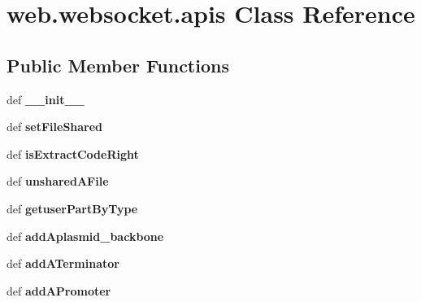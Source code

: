 \hypertarget{classweb_1_1websocket_1_1apis}{\section{web.\-websocket.\-apis Class Reference}
\label{classweb_1_1websocket_1_1apis}
}
\subsection*{Public Member Functions}
\begin{DoxyCompactItemize}
\item 
\hypertarget{classweb_1_1websocket_1_1apis_a5238c2beaa2b1d0a072d166fd98fc59c}{def {\bfseries \-\_\-\-\_\-init\-\_\-\-\_\-}}\label{classweb_1_1websocket_1_1apis_a5238c2beaa2b1d0a072d166fd98fc59c}

\item 
\hypertarget{classweb_1_1websocket_1_1apis_a3fec76d778807e6ac958f69df5bcbe43}{def {\bfseries set\-File\-Shared}}\label{classweb_1_1websocket_1_1apis_a3fec76d778807e6ac958f69df5bcbe43}

\item 
\hypertarget{classweb_1_1websocket_1_1apis_afad457c5d1683e83f299b5a8e8bc6895}{def {\bfseries is\-Extract\-Code\-Right}}\label{classweb_1_1websocket_1_1apis_afad457c5d1683e83f299b5a8e8bc6895}

\item 
\hypertarget{classweb_1_1websocket_1_1apis_ae947e9a3c9305e06bab8212626109552}{def {\bfseries unshared\-A\-File}}\label{classweb_1_1websocket_1_1apis_ae947e9a3c9305e06bab8212626109552}

\item 
\hypertarget{classweb_1_1websocket_1_1apis_ace60e93cc4fecdeea005b8767b4d9746}{def {\bfseries getuser\-Part\-By\-Type}}\label{classweb_1_1websocket_1_1apis_ace60e93cc4fecdeea005b8767b4d9746}

\item 
\hypertarget{classweb_1_1websocket_1_1apis_a4a974f66e9b0a2f3cc111babac7f0b21}{def {\bfseries add\-Aplasmid\-\_\-backbone}}\label{classweb_1_1websocket_1_1apis_a4a974f66e9b0a2f3cc111babac7f0b21}

\item 
\hypertarget{classweb_1_1websocket_1_1apis_af064ec186d51b795f5e529fcefaaa2b5}{def {\bfseries add\-A\-Terminator}}\label{classweb_1_1websocket_1_1apis_af064ec186d51b795f5e529fcefaaa2b5}

\item 
\hypertarget{classweb_1_1websocket_1_1apis_a5c1e119a65ed3da3ae047fb605b99cda}{def {\bfseries add\-A\-Promoter}}\label{classweb_1_1websocket_1_1apis_a5c1e119a65ed3da3ae047fb605b99cda}


\end{DoxyCompactItemize}
